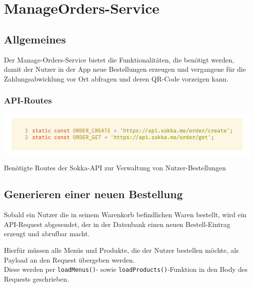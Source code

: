 \section{ManageOrders-Service}

\subsection{Allgemeines}

Der Manage-Orders-Service bietet die Funktionalitäten, die benötigt werden, damit der Nutzer in der
App neue Bestellungen erzeugen und vergangene für die Zahlungsabwicklung vor Ort abfragen und
deren QR-Code vorzeigen kann.

\subsubsection{API-Routes}

\begin{code}
    \centering
    \includegraphics[width=1\textwidth]{images/Client/services/manage-orders/orderRoutes.png}
    \vspace{-25pt}
    \caption{Benötigte Routes der Sokka-API zur Verwaltung von Nutzer-Bestellungen}
\end{code}

\subsection{Generieren einer neuen Bestellung}

Sobald ein Nutzer die in seinem Warenkorb befindlichen Waren bestellt, wird ein API-Request abgesendet,
der in der Datenbank einen neuen Bestell-Eintrag erzeugt und abrufbar macht.

\newpage

Hierfür müssen alle Menüs und Produkte, die der Nutzer bestellen möchte, als Payload an den
Request übergeben werden.\\
Diese werden per \lstinline{loadMenus()}- sowie \lstinline{loadProducts()}-Funktion
in den Body des Requests geschrieben.

